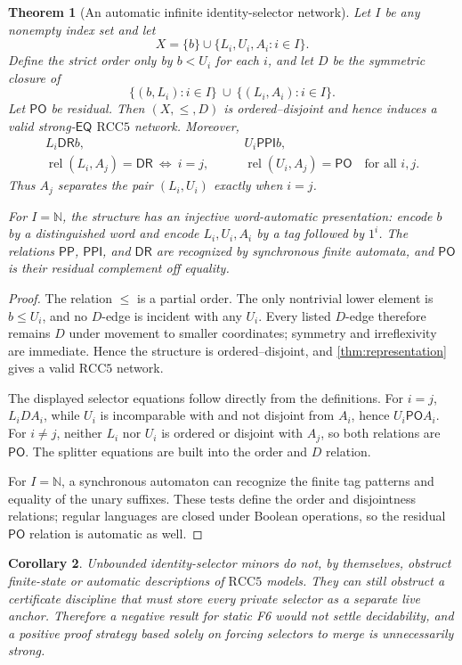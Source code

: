 \documentclass[11pt]{article}
\newtheorem{theorem}{Theorem}[section]
\newtheorem{corollary}[theorem]{Corollary}
\theoremstyle{definition}
\theoremstyle{remark}
\newcommand{\RCC}{\mathrm{RCC5}}
\newcommand{\EQ}{\mathsf{EQ}}
\newcommand{\PP}{\mathsf{PP}}
\newcommand{\PPI}{\mathsf{PPI}}
\newcommand{\PO}{\mathsf{PO}}
\newcommand{\DR}{\mathsf{DR}}
\newcommand{\Rel}{\operatorname{rel}}
\begin{document}
\begin{theorem}[An automatic infinite identity-selector network]\label{thm:selector-auto}
Let $I$ be any nonempty index set and let
\[
 X=\{b\}\cup\{L_i,U_i,A_i:i\in I\}.
\]
Define the strict order only by $b<U_i$ for each $i$, and let $D$ be the symmetric closure of
\[
 \{(b,L_i):i\in I\}\ \cup\ \{(L_i,A_i):i\in I\}.
\]
Let $\PO$ be residual.  Then $(X,\leq,D)$ is ordered--disjoint and hence induces a valid strong-$\EQ$ $\RCC$ network.  Moreover,
\begin{align*}
 L_i\DR b,\qquad &U_i\PPI b,\\
 \Rel(L_i,A_j)=\DR\ \Longleftrightarrow\ i=j,\qquad
 &\Rel(U_i,A_j)=\PO\quad\text{for all }i,j.
\end{align*}
Thus $A_j$ separates the pair $(L_i,U_i)$ exactly when $i=j$.

For $I=\mathbb N$, the structure has an injective word-automatic presentation: encode $b$ by a distinguished word and encode $L_i,U_i,A_i$ by a tag followed by $1^i$.  The relations $\PP$, $\PPI$, and $\DR$ are recognized by synchronous finite automata, and $\PO$ is their residual complement off equality.
\end{theorem}

\begin{proof}
The relation $\leq$ is a partial order.  The only nontrivial lower element is $b\leq U_i$, and no $D$-edge is incident with any $U_i$.  Every listed $D$-edge therefore remains $D$ under movement to smaller coordinates; symmetry and irreflexivity are immediate.  Hence the structure is ordered--disjoint, and \cref{thm:representation} gives a valid $\RCC$ network.

The displayed selector equations follow directly from the definitions.  For $i=j$, $L_iDA_i$, while $U_i$ is incomparable with and not disjoint from $A_i$, hence $U_i\PO A_i$.  For $i\neq j$, neither $L_i$ nor $U_i$ is ordered or disjoint with $A_j$, so both relations are $\PO$.  The splitter equations are built into the order and $D$ relation.

For $I=\mathbb N$, a synchronous automaton can recognize the finite tag patterns and equality of the unary suffixes.  These tests define the order and disjointness relations; regular languages are closed under Boolean operations, so the residual $\PO$ relation is automatic as well.
\end{proof}

\begin{corollary}
Unbounded identity-selector minors do not, by themselves, obstruct finite-state or automatic descriptions of $\RCC$ models.  They can still obstruct a certificate discipline that must store every private selector as a separate live anchor.  Therefore a negative result for static F6 would not settle decidability, and a positive proof strategy based solely on forcing selectors to merge is unnecessarily strong.
\end{corollary}
\end{document}
